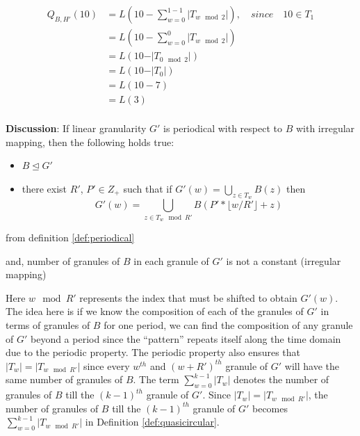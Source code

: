\documentclass[12pt]{article}
\providecommand{\tightlist}{%
  \setlength{\itemsep}{0pt}\setlength{\parskip}{0pt}}
\begin{document}
\begin{equation} \label{eq:eq5}
\begin{split}
Q_{B,H'}(10) & = L(10 - \sum_{w=0}^{1-1}\vert T_{w \mod 2}\vert) ,\quad since \quad  10 \in T_{1}  \\
  & = L(10 - \sum_{w=0}^{0}\vert T_{w\mod 2}\vert) \\
  & = L(10 - \vert T_{0 \mod 2}\vert) \\
  & = L(10 - \vert T_{0}\vert) \\
  & = L(10 - 7) \\
  & = L(3) \\
\end{split}
\end{equation}

\textbf{Discussion}: If linear granularity \(G'\) is periodical with respect to \(B\) with irregular mapping, then the following holds true:

\begin{itemize}
\tightlist
\item
  \(B \trianglelefteq G'\)
\item
  there exist \(R'\), \(P' \in Z_+\) such that if \(G'(w) = \bigcup_{z \in T_w}B(z)\) then \[G'(w) = \bigcup_{z \in T_w \mod R'}B(P'*\lfloor w/R' \rfloor + z)\]
\end{itemize}

from definition \ref{def:periodical}

and, number of granules of \(B\) in each granule of \(G'\) is not a constant (irregular mapping)

Here \(w \mod R'\) represents the index that must be shifted to obtain \(G'(w)\). The idea here is if we know the composition of each of the granules of \(G'\) in terms of granules of \(B\) for one period, we can find the composition of any granule of \(G'\) beyond a period since the ``pattern'' repeats itself along the time domain due to the periodic property. The periodic property also ensures that \(\vert T_w \vert = \vert T_{w\mod R'} \vert\) since every \(w^{th}\) and \((w+R')^{th}\) granule of \(G'\) will have the same number of granules of \(B\). The term \(\sum_{w=0}^{k-1}\vert T_{w}\vert\) denotes the number of granules of \(B\) till the \((k-1)^{th}\) granule of \(G'\). Since \(\vert T_w \vert = \vert T_{w\mod R'} \vert\), the number of granules of \(B\) till the \((k-1)^{th}\) granule of \(G'\) becomes \(\sum_{w=0}^{k-1}\vert T_{w \mod R'}\vert\) in Definition \autoref{def:quasicircular}.
\end{document}
